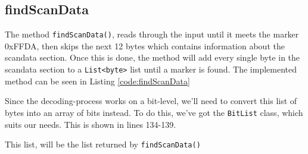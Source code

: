 \subsection{findScanData}
The method \lstinline|findScanData()|, reads through the input until it meets the marker 0xFFDA, then skips the next 12 bytes which contains information about the scandata section.
Once this is done, the method will add every single byte in the scandata section to a \lstinline|List<byte>| list until a marker is found. The implemented method can be seen in Listing \ref{code:findScanData}

Since the decoding-process works on a bit-level, we'll need to convert this list of bytes into an array of bits instead. To do this, we've got the \lstinline|BitList| class, which suits our needs. This is shown in lines 134-139.

This list, will be the list returned by \lstinline|findScanData()|

